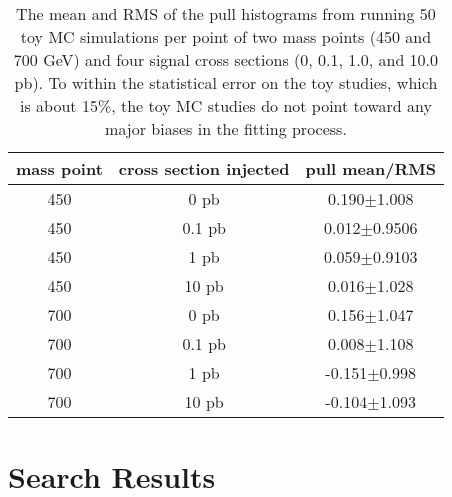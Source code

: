 \begin{table}
    \center
    \caption{The mean and RMS of the pull histograms from running 50 toy MC
    simulations per point of two mass points (450 and 700 GeV) and four signal cross sections
    (0, 0.1, 1.0, and 10.0 pb).  To within the statistical error on the toy studies, which
    is about 15\%, the toy MC studies do not point toward any major biases in the fitting process. \label{tab:pulls}}
    \begin{tabular}{c c c}\hline \hline
    mass point & cross section injected & pull mean/RMS \\
    \hline
    450 & 0 pb & 0.190$\pm$1.008 \\
    450 & 0.1 pb & 0.012$\pm$0.9506 \\
    450 & 1 pb & 0.059$\pm$0.9103 \\
    450 & 10 pb & 0.016$\pm$1.028 \\
    700 & 0 pb & 0.156$\pm$1.047 \\
    700 & 0.1 pb & 0.008$\pm$1.108 \\
    700 & 1 pb & -0.151$\pm$0.998 \\
    700 & 10 pb & -0.104$\pm$1.093 \\
    \hline
    \end{tabular}
\end{table}



\section{Search Results} 

